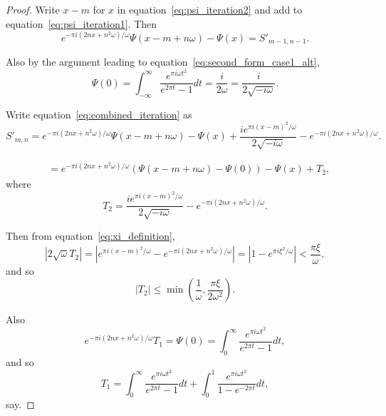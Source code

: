 \documentclass[12pt]{article}
\theoremstyle{remark}
\begin{document}
\begin{proof}
Write $x - m$ for $x$ in equation~\eqref{eq:psi_iteration2} and add to equation~\eqref{eq:psi_iteration1}. Then
\begin{equation}\label{eq:combined_iteration}
e^{-\pi i(2nx+n^2\omega)/\omega} \Psi(x - m + n\omega) - \Psi(x) = S'_{m-1,n-1}.
\end{equation}

Also by the argument leading to equation~\eqref{eq:second_form_case1_alt},
\begin{equation}\label{eq:psi_zero}
\Psi(0) = \int_{-\infty}^\infty \frac{e^{\pi i\omega t^2}}{e^{2\pi t} - 1} dt = \frac{i}{2\omega} = \frac{i}{2\sqrt{-i\omega}}.
\end{equation}

Write equation~\eqref{eq:combined_iteration} as
\begin{equation}\label{eq:iteration_rewrite}
S'_{m,n} = e^{-\pi i(2nx+n^2\omega)/\omega} \Psi(x - m + n\omega) - \Psi(x) + \frac{i e^{\pi i(x-m)^2/\omega}}{2\sqrt{-i\omega}} - e^{-\pi i(2nx+n^2\omega)/\omega}.
\end{equation}

\begin{align}
&= e^{-\pi i(2nx+n^2\omega)/\omega} (\Psi(x - m + n\omega) - \Psi(0)) - \Psi(x) + T_2, \label{eq:T_decomposition}
\end{align}
where
\begin{equation}\label{eq:T2_definition}
T_2 = \frac{i e^{\pi i(x-m)^2/\omega}}{2\sqrt{-i\omega}} - e^{-\pi i(2nx+n^2\omega)/\omega}.
\end{equation}

Then from equation~\eqref{eq:xi_definition},
\begin{equation}\label{eq:T2_bound}
|2\sqrt{\omega} T_2| = |e^{\pi i(x-m)^2/\omega} - e^{-\pi i(2nx+n^2\omega)/\omega}| = |1 - e^{\pi i \xi^2/\omega}| < \frac{\pi \xi}{\omega},
\end{equation}
and so
\begin{equation}\label{eq:T2_final_bound}
|T_2| \leq \min\left(\frac{1}{\omega}, \frac{\pi\xi}{2\omega^2}\right).
\end{equation}

Also
\begin{equation}\label{eq:T1_definition}
e^{-\pi i(2nx+n^2\omega)/\omega} T_1 = \Psi(0) = \int_0^\infty \frac{e^{\pi i\omega t^2}}{e^{2\pi t} - 1} dt,
\end{equation}
and so
\begin{equation}\label{eq:T1_decomposition}
T_1 = \int_0^\infty \frac{e^{\pi i\omega t^2}}{e^{2\pi t} - 1} dt + \int_0^1 \frac{e^{\pi i\omega t^2}}{1 - e^{-2\pi t}} dt,
\end{equation}
say.


\end{proof}
\end{document}
